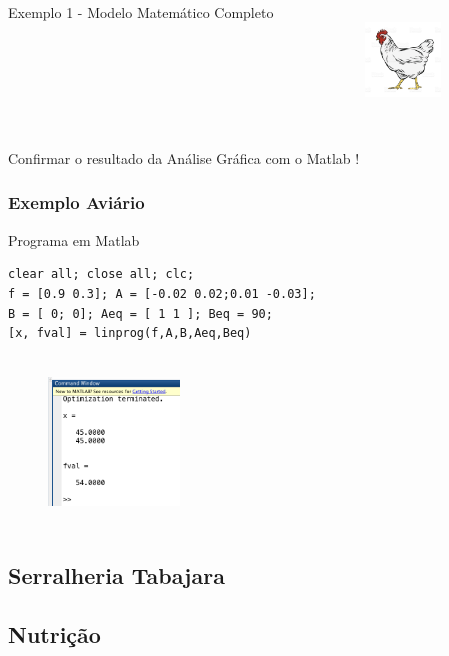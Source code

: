 \documentclass{beamer}
\begin{document}
\begin{frame}
\begin{columns}
\begin{column}{0.8\textwidth}
\begin{exampleblock}{Exemplo 1 - Modelo Matemático Completo}
{				}
			\end{exampleblock}
		\end{column}
		\begin{column}{0.2\textwidth}
			\centering
			\includegraphics[width=2cm,height=3cm]{aviario.jpg}
		\end{column}
	\end{columns}
	{
	\begin{mdframed}[backgroundcolor=blue!20]
		\Large
		Confirmar o resultado da Análise Gráfica com o Matlab !
	\end{mdframed}
	}	
\end{frame}

\begin{frame}[fragile] 
	\frametitle{Exemplo Aviário}
	\centering
	\begin{block}{Programa em Matlab}
		\begin{lstlisting}
clear all; close all; clc;
f = [0.9 0.3]; A = [-0.02 0.02;0.01 -0.03]; 
B = [ 0; 0]; Aeq = [ 1 1 ]; Beq = 90;
[x, fval] = linprog(f,A,B,Aeq,Beq)	
		\end{lstlisting}	
	\end{block}	

	\begin{figure}
		\includegraphics[width=3.5cm,height=4.5cm]{MatLabAviario.png}
	\end{figure}

\end{frame}

\subsection{Serralheria Tabajara}

\subsection{Nutrição}
\end{document}
